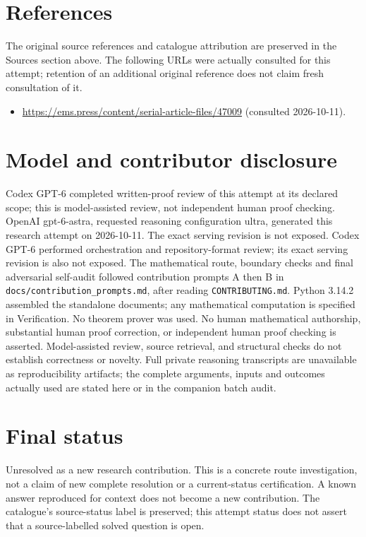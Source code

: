 \documentclass[11pt]{article}
\begin{document}
\section{References}
The original source references and catalogue attribution are preserved in the
Sources section above. The following URLs were actually consulted for this attempt;
retention of an additional original reference does not claim fresh consultation of it.
\begin{itemize}
\item \url{https://ems.press/content/serial-article-files/47009} (consulted 2026-10-11). 
\end{itemize}
\section{Model and contributor disclosure}
Codex GPT-6 completed written-proof review of this attempt at its declared scope; this is model-assisted review, not independent human proof checking.
OpenAI gpt-6-astra, requested reasoning configuration ultra, generated this research
attempt on 2026-10-11. The exact serving revision is not exposed. Codex GPT-6
performed orchestration and repository-format review; its exact serving revision
is also not exposed. The mathematical route, boundary checks and final adversarial
self-audit followed contribution prompts A then B in
\texttt{docs/contribution\_prompts.md}, after reading \texttt{CONTRIBUTING.md}.
Python 3.14.2 assembled the standalone documents; any mathematical computation is
specified in Verification. No theorem prover was used. No human mathematical
authorship, substantial human proof correction, or independent human proof checking
is asserted. Model-assisted review, source retrieval, and structural checks do not
establish correctness or novelty. Full private reasoning transcripts are unavailable
as reproducibility artifacts; the complete arguments, inputs and outcomes actually
used are stated here or in the companion batch audit.
\section{Final status}
Unresolved as a new research contribution. This is a concrete route investigation,
not a claim of new complete resolution or a current-status certification. A known
answer reproduced for context does not become a new contribution. The catalogue's
source-status label is preserved; this attempt status does not assert that a
source-labelled solved question is open.
\end{document}

